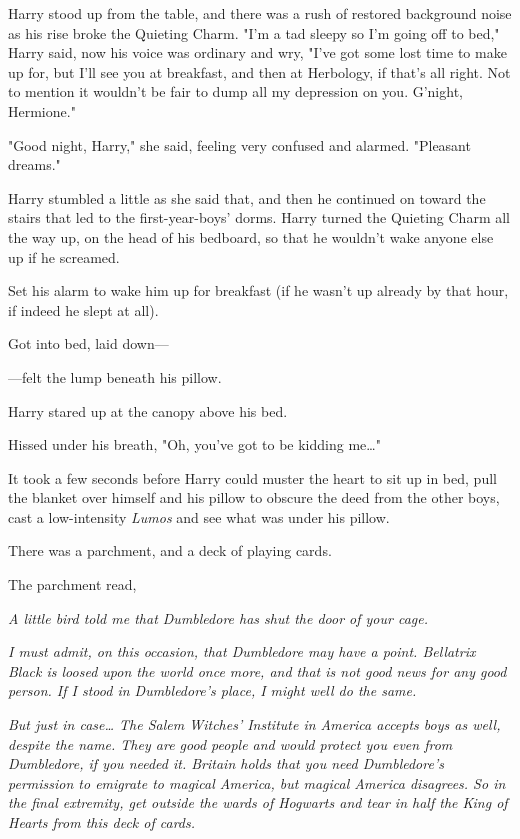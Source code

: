 Harry stood up from the table, and there was a rush of restored background 
noise as his rise broke the Quieting Charm. "I'm a tad sleepy so I'm going off 
to bed," Harry said, now his voice was ordinary and wry, "I've got some lost 
time to make up for, but I'll see you at breakfast, and then at Herbology, if 
that's all right. Not to mention it wouldn't be fair to dump all my depression 
on you. G'night, Hermione."

"Good night, Harry," she said, feeling very confused and alarmed. "Pleasant 
dreams."

Harry stumbled a little as she said that, and then he continued on toward the 
stairs that led to the first-year-boys' dorms.
\sbreak
Harry turned the Quieting Charm all the way up, on the head of his bedboard, so 
that he wouldn't wake anyone else up if he screamed.

Set his alarm to wake him up for breakfast (if he wasn't up already by that 
hour, if indeed he slept at all).

Got into bed, laid down---

---felt the lump beneath his pillow.

Harry stared up at the canopy above his bed.

Hissed under his breath, "Oh, you've got to be kidding me{\ldots}"

It took a few seconds before Harry could muster the heart to sit up in bed, 
pull the blanket over himself and his pillow to obscure the deed from the other 
boys, cast a low-intensity \emph{Lumos} and see what was under his pillow.

There was a parchment, and a deck of playing cards.

The parchment read,

\emph{A little bird told me that Dumbledore has shut the door of your cage.}

\emph{I must admit, on this occasion, that Dumbledore may have a point. 
Bellatrix Black is loosed upon the world once more, and that is not good news 
for any good person. If I stood in Dumbledore's place, I might well do the 
same.}

\emph{But just in case{\ldots} The Salem Witches' Institute in America accepts 
boys as well, despite the name. They are good people and would protect you even 
from Dumbledore, if you needed it. Britain holds that you need Dumbledore's 
permission to emigrate to magical America, but magical America disagrees. So in 
the final extremity, get outside the wards of Hogwarts and tear in half the 
King of Hearts from this deck of cards.}

